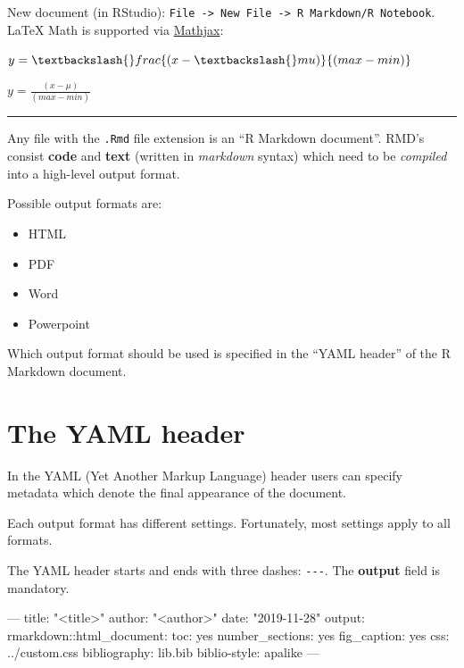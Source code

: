 \documentclass[]{book}
\newenvironment{Shaded}{}{}
\newcommand{\AttributeTok}[1]{#1}
\newcommand{\FunctionTok}[1]{#1}
\newcommand{\NormalTok}[1]{#1}
\newcommand{\OperatorTok}[1]{#1}
\newcommand{\OtherTok}[1]{\textcolor[rgb]{1.00,0.25,0.00}{#1}}
\newcommand{\StringTok}[1]{\textcolor[rgb]{0.00,0.50,0.50}{#1}}
\begin{document}
New document (in RStudio): \texttt{File\ -\textgreater{}\ New\ File\ -\textgreater{}\ R\ Markdown/R\ Notebook}.
LaTeX Math is supported via \href{https://www.mathjax.org/}{Mathjax}:

\begin{Shaded}
\begin{Highlighting}[]
\OperatorTok{$}\NormalTok{y=\textbackslash{}frac\{(x }\OperatorTok{-}\StringTok{ }\NormalTok{\textbackslash{}mu)\}\{(max }\OperatorTok{-}\StringTok{ }\NormalTok{min)\}}\OperatorTok{$}
\end{Highlighting}
\end{Shaded}

\(y=\frac{(x - \mu)}{(max - min)}\)

\begin{center}\rule{0.5\linewidth}{\linethickness}\end{center}

Any file with the \texttt{.Rmd} file extension is an ``R Markdown document''.
RMD's consist \textbf{code} and \textbf{text} (written in \emph{markdown} syntax) which need to be \emph{compiled} into a high-level output format.

Possible output formats are:

\begin{itemize}
\item
  HTML
\item
  PDF
\item
  Word
\item
  Powerpoint
\end{itemize}

Which output format should be used is specified in the ``YAML header'' of the R Markdown document.

\hypertarget{the-yaml-header}{%
\section{The YAML header}\label{the-yaml-header}}

In the YAML (Yet Another Markup Language) header users can specify metadata which denote the final appearance of the document.

Each output format has different settings.
Fortunately, most settings apply to all formats.

The YAML header starts and ends with three dashes: \texttt{-\/-\/-}.
The \textbf{output} field is mandatory.

\begin{Shaded}
\begin{Highlighting}[]
\OtherTok{---}
\FunctionTok{title:}\AttributeTok{ }\StringTok{"<title>"}
\FunctionTok{author:}\AttributeTok{ }\StringTok{"<author>"}
\FunctionTok{date:}\AttributeTok{ }\StringTok{"2019-11-28"}
\FunctionTok{output:}
  \FunctionTok{rmarkdown:}\AttributeTok{:html_document:}
    \FunctionTok{toc:}\AttributeTok{ yes}
    \FunctionTok{number_sections:}\AttributeTok{ yes}
    \FunctionTok{fig_caption:}\AttributeTok{ yes}
    \FunctionTok{css:}\AttributeTok{ ../custom.css}
\FunctionTok{bibliography:}\AttributeTok{ lib.bib}
\FunctionTok{biblio-style:}\AttributeTok{ apalike}
\OtherTok{---}
\end{Highlighting}
\end{Shaded}
\end{document}
